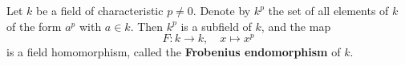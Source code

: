 Let $k$ be a field of characteristic $p \neq 0$. Denote by $k^p$ the set of all elements of $k$ of the form $a^p$ with $a \in k$. Then $k^p$ is a subfield of $k$, and the map
$$
F: k \to k, \quad x \mapsto x^p
$$
is a field homomorphism, called the \textbf{Frobenius endomorphism} of $k$.

